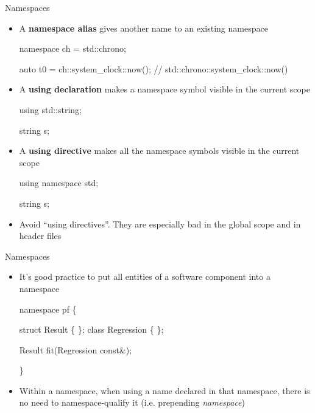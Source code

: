 \begin{frame}[fragile]{Namespaces \insertcontinuationtext}

  \begin{itemize}

  \item<1-> A \textbf{namespace alias} gives another name to an existing namespace
    \begin{codeblock}
namespace ch = std::chrono;

auto t0 = ch::system_clock::now(); // std::chrono::system_clock::now()\end{codeblock}
  \item<2-> A \textbf{using declaration} makes a namespace symbol visible in the
  current scope
    \begin{codeblock}
using std::string;

string s;\end{codeblock}
  \item<3-> A \textbf{using directive} makes \alert{all} the namespace symbols visible
  in the current scope
    \begin{codeblock}
using namespace std;

string s;\end{codeblock}

  \item<4-> Avoid ``using directives''. They are especially bad in the global scope
    and in header files
  \end{itemize}
\end{frame}

\begin{frame}[fragile]{Namespaces \insertcontinuationtext}

  \begin{itemize}
  \item It's good practice to put all entities of a software component into a namespace

    \begin{codeblock}
namespace pf \{

struct Result \{ \ddd \};
class Regression \{ \ddd \};

Result fit(Regression const&);

\}\end{codeblock}

  \item Within a namespace, when using a name declared in that namespace, there is
    no need to namespace-qualify it (i.e. prepending \textit{namespace}\code{::})
  \end{itemize}

\end{frame}


